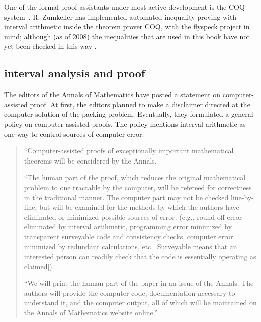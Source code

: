 One of the formal proof assistants under most active development is
the COQ system~\cite{COQ}.  R. Zumkeller has implemented automated
inequality proving with interval arithmetic inside the theorem prover
COQ, with the flyspeck project in mind; although (as of 2008) the
inequalities that are used in this book have not yet been checked in
this way \cite{Zu}.


\subsection{interval analysis and proof}


The editors of the Annals of Mathematics have posted a statement on
computer-assisted proof.  At first, the editors planned to make a
disclaimer directed at the computer solution of the packing problem.
Eventually, they formulated a general policy on computer-assisted
proofs.  The policy mentions interval arithmetic as one way to control
sources of computer error.


\begin{quote}

  ``Computer-assisted proofs of exceptionally important mathematical
  theorems will be considered by the Annals.

  ``The human part of the proof, which reduces the original
  mathematical problem to one tractable by the computer, will be
  refereed for correctness in the traditional manner. The computer
  part may not be checked line-by-line, but will be examined for the
  methods by which the authors have eliminated or minimized possible
  sources of error: (e.g., round-off error eliminated by interval
  artihmetic, programming error minimized by transparent surveyable
  code and consistency checks, computer error minimized by redundant
  calculations, etc. [Surveyable means that an interested person can
  readily check that the code is essentially operating as claimed]).

  ``We will print the human part of the paper in an issue of the
  Annals. The authors will provide the computer code, documentation
  necessary to understand it, and the computer output, all of which
  will be maintained on the Annals of Mathematics website online.''
  \cite{Ann06}

\end{quote}

